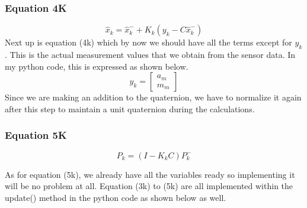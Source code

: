 \documentclass[a4paper,12pt]{book}
\begin{document}
\subsubsection{Equation 4K}

\begin{equation}
    \hat{x}_k=\hat{x}^-_k+K_k(y_k-C\hat{x}^-_k)
\end{equation}
Next up is equation (4k) which by now we should have all the terms except for $y_k$. This is the actual measurement values that we obtain from the sensor data. In my python code, this is expressed as shown below.
\begin{equation}
    y_k = \begin{bmatrix} a_m \\ m_m \end{bmatrix}
\end{equation}
Since we are making an addition to the quaternion, we have to normalize it again after this step to maintain a unit quaternion during the calculations.

\subsubsection{Equation 5K}

\begin{equation}
    P_k=(I-K_kC)P^-_k
\end{equation}

As for equation (5k), we already have all the variables ready so implementing it will be no problem at all. Equation (3k) to (5k) are all implemented within the update() method in the python code as shown below as well.



\appendix
\newpage
\nocite{*}

% 
\printbibliography
\end{document}
